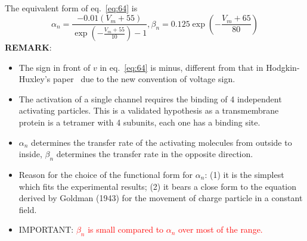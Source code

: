 The equivalent form of eq.~\eqref{eq:64} is
\begin{equation}
  \label{eq:352}
      \alpha_n = \frac{-0.01 (V_m+55)}{\exp(-\frac{V_m+55}{10})-1}
      ,
      \beta_n = 0.125 \exp(-\frac{V_m+65}{80})  
\end{equation}
{\bf REMARK}:
\begin{itemize}

\item The sign in front of $v$ in eq.~\eqref{eq:64} is minus,
  different from that in Hodgkin-Huxley's paper~\citep{hodgkin1952ap}
  due to the new convention of voltage sign.

\item The activation of a single  channel requires the binding
  of 4 independent activating particles. This is a validated
  hypothesis as a transmembrane protein is a tetramer with 4 subunits,
  each one has a binding site.

\item $\alpha_n$ determines the transfer rate of the activating
  molecules from outside to inside, $\beta_n$ determines the transfer
  rate in the opposite direction.

\item Reason for the choice of the functional form for $\alpha_n$: (1)
  it is the simplest which fits the experimental results; (2) it bears
  a close form to the equation derived by Goldman (1943) for the
  movement of charge particle in a constant field.

\item IMPORTANT:
  \textcolor{red}{$\beta_n$ is small compared to $\alpha_n$ over most
    of the range.}
\end{itemize}


% 



